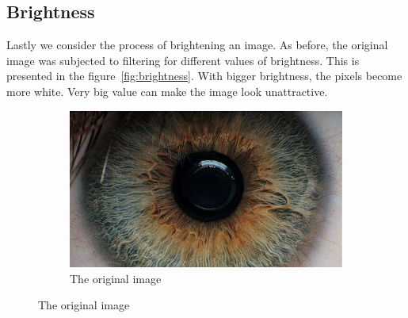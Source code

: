 \documentclass{article}
\begin{document}
\subsection{Brightness}

Lastly we consider the process of brightening an image. As before, the original image was subjected to filtering for different values of brightness. This is presented in the figure~\ref{fig:brightness}.
With bigger brightness, the pixels become more white. Very big value can make the image look unattractive.




\begin{figure}[H]
\centering

\begin{subfigure}[b]{0.5\linewidth}
\centering
  \includegraphics[width=0.9\linewidth]{res/index.jpg}
  \caption{The original image}
   \label{fig:bright_org}
\end{subfigure}%


\end{figure}
\end{document}
